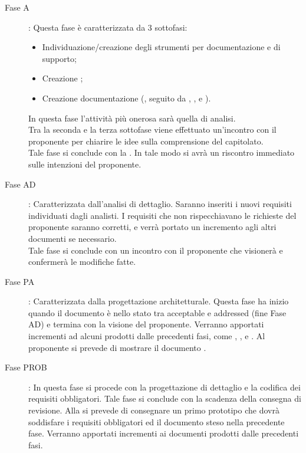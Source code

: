 		\begin{description}
			\item[Fase A]: Questa fase è caratterizzata da 3 sottofasi:
				\begin{itemize}
					\item Individuazione/creazione degli strumenti per documentazione e di supporto;
					\item Creazione ;
					\item Creazione documentazione (, seguito da , ,  e ).
				\end{itemize}
				In questa fase l'attività più onerosa sarà quella di analisi.\\Tra la seconda e la terza sottofase viene effettuato un'incontro con il proponente per chiarire le idee sulla comprensione del capitolato.\\Tale fase si conclude con la . In tale modo si avrà un riscontro immediato sulle intenzioni del proponente.
			\item[Fase AD]: Caratterizzata dall’analisi di dettaglio. Saranno inseriti i nuovi requisiti individuati dagli analisti. I requisiti che non rispecchiavano le richieste del proponente saranno corretti, e verrà portato un incremento agli altri documenti se necessario.\\Tale fase si conclude con un incontro con il proponente che visionerà e confermerà le modifiche fatte.
			\item[Fase PA]: Caratterizzata dalla progettazione architetturale. Questa fase ha inizio quando il documento  è nello stato tra acceptable e addressed (fine Fase AD) e termina con la visione del proponente. Verranno apportati incrementi ad alcuni prodotti dalle precedenti fasi, come , ,  e . Al proponente si prevede di mostrare il documento .
			\item[Fase PROB]: In questa fase si procede con la progettazione di dettaglio e la codifica dei requisiti obbligatori. Tale fase si conclude con la scadenza della consegna di revisione. Alla  si prevede di consegnare un primo prototipo che dovrà soddisfare i requisiti obbligatori ed il documento  steso nella precedente fase. Verranno apportati incrementi ai documenti prodotti dalle precedenti fasi.

\end{description}
